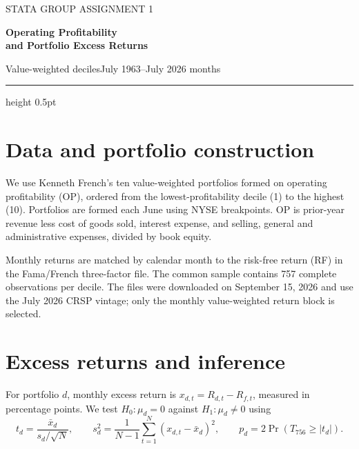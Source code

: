\documentclass[11pt,letterpaper]{article}
\begin{document}
{\small\color{muted}STATA GROUP ASSIGNMENT 1}\par
\vspace{3pt}
{\fontsize{24}{28}\selectfont\bfseries\color{ink}Operating Profitability\\and Portfolio Excess Returns}\par
\vspace{4pt}
{\small Value-weighted deciles\enspace\textbar\enspace July 1963--July 2026\enspace\textbar{} months}
\vspace{7pt}\hrule height 0.5pt\vspace{5pt}

\section{Data and portfolio construction}
We use Kenneth French's ten value-weighted portfolios formed on operating profitability (OP), ordered from the lowest-profitability decile (1) to the highest (10). Portfolios are formed each June using NYSE breakpoints. OP is prior-year revenue less cost of goods sold, interest expense, and selling, general and administrative expenses, divided by book equity.

Monthly returns are matched by calendar month to the risk-free return (RF) in the Fama/French three-factor file. The common sample contains 757 complete observations per decile. The files were downloaded on September 15, 2026 and use the July 2026 CRSP vintage; only the monthly value-weighted return block is selected.

\section{Excess returns and inference}
For portfolio $d$, monthly excess return is $x_{d,t}=R_{d,t}-R_{f,t}$, measured in percentage points. We test $H_0:\mu_d=0$ against $H_1:\mu_d\ne0$ using
\begin{equation*}
 t_d=\frac{\bar{x}_d}{s_d/\sqrt{N}},\qquad
 s_d^2=\frac{1}{N-1}\sum_{t=1}^{N}(x_{d,t}-\bar{x}_d)^2,\qquad
 p_d=2\Pr\!\left(T_{756}\geq |t_d|\right).
\end{equation*}
\vspace{-6pt}
\end{document}
